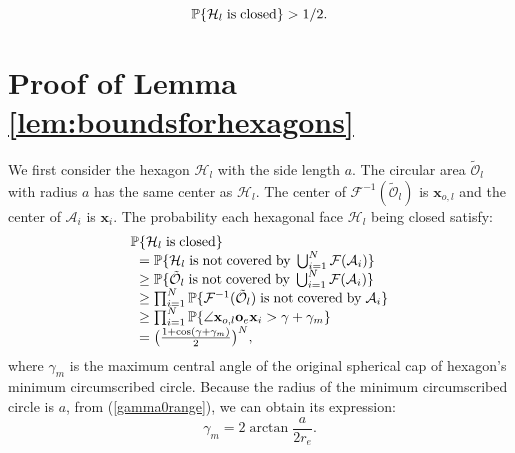 \documentclass[final]{IEEEtran}
\begin{document}
\begin{equation}
    \P\{\mathcal{H}_{l} {\rm \; is\;closed}\}>1/2.
\end{equation}
\section{Proof of Lemma \ref{lem:boundsforhexagons}}\label{app:boundsforhexagons}
\indent We first consider the hexagon $\mathcal{H}_{l}$ with the side length 
$a$. The circular area $\tilde{\mathcal{O}}_{l}$ with radius $a$ has the same center as $\mathcal{H}_{l}$. The center of 
$\mathcal{F}^{-1}(\tilde{\mathcal{O}}_{l})$ is $\textbf{x}_{o,l}$ and the center of $\mathcal{A}_i$ is $\textbf{x}_i$. The probability each hexagonal face $\mathcal{H}_{l}$ being closed satisfy:
\begin{equation}%
\begin{array}{r@{}l}
    \P&\displaystyle\{\mathcal{H}_{l}\;{\rm is\;closed}\}\\
    &=\P\{\mathcal{H}_{l}\;{\rm is\;not\;covered\;by\;}\bigcup_{i=1}^{N}\mathcal{F}(\mathcal{A}_i)\}\\
    &\geq\P\{\tilde{\mathcal{O}}_{l}\;{\rm is\;not\;covered\;by\;}\bigcup_{i=1}^{N}\mathcal{F}(\mathcal{A}_i)\}\\
    &\geq\prod_{i=1}^{N}\P\{\mathcal{F}^{-1}(\tilde{\mathcal{O}}_{l})\;{\rm is\;not\;covered\;by\;}\mathcal{A}_i\}\\
    &\geq\prod_{i=1}^{N}\P\{\angle \textbf{x}_{o,l} \textbf{o}_e \textbf{x}_i>\gamma+\gamma_m\}\\
    &=\big(\frac{1+\cos(\gamma+\gamma_m)}{2}\big)^{N},\\
\end{array}
\end{equation}
where $\gamma_m$ is the maximum central angle of the original spherical cap of hexagon's minimum circumscribed circle. Because the radius of the minimum circumscribed circle is $a$, from (\ref{gamma0range}), we can obtain its expression:
\begin{equation}
    \gamma_m=2\arctan \frac{a}{2r_e}.
\end{equation}
\end{document}
